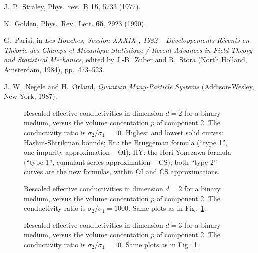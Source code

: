 \begin{references}
 J.\ P.\ Straley, Phys.\ rev.\ B {\bf 15}, 5733
(1977).

 K.\ Golden, Phys.\ Rev.\ Lett. {\bf 65}, 2923 (1990).

 G.~Parisi, in {\it Les Houches, Session XXXIX , 1982 -- 
D\'eveloppements R\'ecents en Th\'eorie des Champs et M\'ecanique 
Statistique / Recent Advances in Field Theory and Statistical Mechanics}, 
edited by  J.-B.\ Zuber and R.~Stora (North Holland, Amsterdam, 1984), 
pp.\ 473--523.

 J.~W.~Negele and H.~Orland, 
{\it Quantum Many-Particle Systems} (Addison-Wesley, New York, 1987).
\end{references}

%
\twocolumn
%
\begin{figure}
\narrowtext
\vspace*{0.0cm}
\centerline{
}
\vspace*{0.3cm}
\caption{Rescaled effective conductivities in dimension $d=2$ 
for a binary medium, versus the volume concentation $p$ of 
component 2. The conductivity ratio is $\sigma_2/\sigma_1=10$. 
Highest and lowest solid curves: Hashin-Shtrikman bounds; Br.: 
the Bruggeman formula (``type 1'', one-impurity 
approximation -- OI); HY: the Hori-Yonezawa formula (``type 1'',
cumulant series approximation -- CS); both ``type 2'' curves 
are the new formulas, within OI and CS approximations. 
}
\label{fig1} 
\end{figure} 

\begin{figure}
\narrowtext
\vspace*{0.0cm}
\centerline{
}
\vspace*{0.3cm}
\caption{Rescaled effective conductivities in dimension $d=2$ 
for a binary medium, versus the volume concentation $p$ of 
component 2. The conductivity ratio is $\sigma_2/\sigma_1=1000$.
Same plots as in Fig.\ \ref{fig1}.
}
\label{fig2}
\end{figure}

\begin{figure}
\narrowtext
\vspace*{0.0cm}
\centerline{
}
\vspace*{0.3cm}
\caption{Rescaled effective conductivities in dimension $d=3$ 
for a binary medium, versus the volume concentation $p$ of 
component 2. The conductivity ratio is $\sigma_2/\sigma_1=10$.
Same plots as in Fig.\ \ref{fig1}.\\
\\
\\
\\
}
\label{fig3}
\end{figure}

